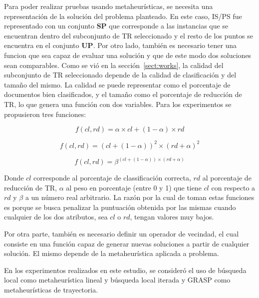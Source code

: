 \documentclass{ci5652}
\begin{document}
Para poder realizar pruebas usando metaheurísticas, se necesita una representación de la solución del problema planteado. En este caso, IS/PS fue representado con un conjunto \textbf{SP} que corresponde a las instancias que se encuentran dentro del subconjunto de TR seleccionado y el resto de los puntos se encuentra en el conjunto \textbf{UP}. Por otro lado, también es necesario tener una funcion que sea capaz de evaluar una solución y que de este modo dos soluciones sean comparables. Como se vió en la sección~\ref{sect:works}, la calidad del subconjunto de TR seleccionado depende de la calidad de clasificación y del tamaño del mismo. La calidad se puede representar como el porcentaje de documentos bien clasificados, y el tamaño como el porcentaje de reducción de TR, lo que genera una función con dos variables. Para los experimentos se propusieron tres funciones:

\begin{equation}\label{eq:weight}
f(cl,rd) = \alpha\times cl + (1 - \alpha)\times rd
\end{equation}

\begin{equation}\label{eq:sqr}
f(cl,rd) = (cl + (1 - \alpha))^{2}\times (rd + \alpha)^{2}
\end{equation}

\begin{equation}\label{eq:exp}
f(cl,rd) = \beta^{(cl + (1 - \alpha))\times (rd + \alpha)}
\end{equation}

Donde $cl$ corresponde al porcentaje de classificación correcta, $rd$ al porcentaje de reducción de TR, $\alpha$ al peso en porcentaje (entre 0 y 1) que tiene $cl$ con respecto a $rd$ y $\beta$ a un número real arbitrario. La razón por la cual de toman estas funciones es porque se busca penalizar la puntuación obtenida por las mismas cuando cualquier de los dos atributos, sea $cl$ o $rd$, tengan valores muy bajos.

Por otra parte, también es necesario definir un operador de vecindad, el cual consiste en una función capaz de generar nuevas soluciones a partir de cualquier solución. El mismo depende de la metaheurística aplicada a problema.

En los experimentos realizados en este estudio, se consideró el uso de búsqueda local como metaheurística lineal y búsqueda local iterada y GRASP como metaheurísticas de trayectoria.
\end{document}
